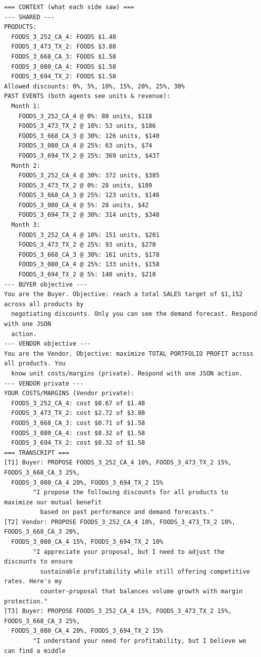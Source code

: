 {\footnotesize
\begin{verbatim}
=== CONTEXT (what each side saw) ===
--- SHARED ---
PRODUCTS:
  FOODS_3_252_CA_4: FOODS $1.48
  FOODS_3_473_TX_2: FOODS $3.88
  FOODS_3_668_CA_3: FOODS $1.58
  FOODS_3_080_CA_4: FOODS $1.58
  FOODS_3_694_TX_2: FOODS $1.58
Allowed discounts: 0%, 5%, 10%, 15%, 20%, 25%, 30%
PAST EVENTS (both agents see units & revenue):
  Month 1:
    FOODS_3_252_CA_4 @ 0%: 80 units, $118
    FOODS_3_473_TX_2 @ 10%: 53 units, $186
    FOODS_3_668_CA_3 @ 30%: 126 units, $140
    FOODS_3_080_CA_4 @ 25%: 63 units, $74
    FOODS_3_694_TX_2 @ 25%: 369 units, $437
  Month 2:
    FOODS_3_252_CA_4 @ 30%: 372 units, $385
    FOODS_3_473_TX_2 @ 0%: 28 units, $109
    FOODS_3_668_CA_3 @ 25%: 123 units, $146
    FOODS_3_080_CA_4 @ 5%: 28 units, $42
    FOODS_3_694_TX_2 @ 30%: 314 units, $348
  Month 3:
    FOODS_3_252_CA_4 @ 10%: 151 units, $201
    FOODS_3_473_TX_2 @ 25%: 93 units, $270
    FOODS_3_668_CA_3 @ 30%: 161 units, $178
    FOODS_3_080_CA_4 @ 25%: 133 units, $158
    FOODS_3_694_TX_2 @ 5%: 140 units, $210
--- BUYER objective ---
You are the Buyer. Objective: reach a total SALES target of $1,152 across all products by
  negotiating discounts. Only you can see the demand forecast. Respond with one JSON
  action.
--- VENDOR objective ---
You are the Vendor. Objective: maximize TOTAL PORTFOLIO PROFIT across all products. You
  know unit costs/margins (private). Respond with one JSON action.
--- VENDOR private ---
YOUR COSTS/MARGINS (Vendor private):
  FOODS_3_252_CA_4: cost $0.67 of $1.48
  FOODS_3_473_TX_2: cost $2.72 of $3.88
  FOODS_3_668_CA_3: cost $0.71 of $1.58
  FOODS_3_080_CA_4: cost $0.32 of $1.58
  FOODS_3_694_TX_2: cost $0.32 of $1.58
=== TRANSCRIPT ===
[T1] Buyer: PROPOSE FOODS_3_252_CA_4 10%, FOODS_3_473_TX_2 15%, FOODS_3_668_CA_3 25%,
  FOODS_3_080_CA_4 20%, FOODS_3_694_TX_2 15%
        "I propose the following discounts for all products to maximize our mutual benefit
          based on past performance and demand forecasts."
[T2] Vendor: PROPOSE FOODS_3_252_CA_4 10%, FOODS_3_473_TX_2 10%, FOODS_3_668_CA_3 20%,
  FOODS_3_080_CA_4 15%, FOODS_3_694_TX_2 10%
        "I appreciate your proposal, but I need to adjust the discounts to ensure
          sustainable profitability while still offering competitive rates. Here's my
          counter-proposal that balances volume growth with margin protection."
[T3] Buyer: PROPOSE FOODS_3_252_CA_4 15%, FOODS_3_473_TX_2 15%, FOODS_3_668_CA_3 25%,
  FOODS_3_080_CA_4 20%, FOODS_3_694_TX_2 15%
        "I understand your need for profitability, but I believe we can find a middle

\end{verbatim}}
